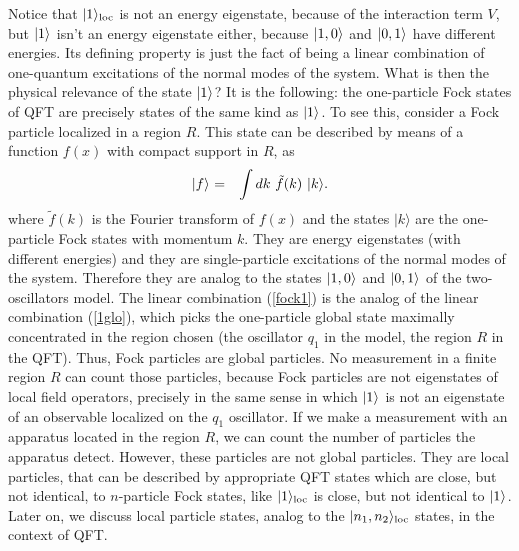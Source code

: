 \documentclass[10pt, nofootinbib]{revtex4}
\newcommand{\bea}{\begin{eqnarray}}
\newcommand{\eea}{\end{eqnarray}}
\begin{document}
Notice that $|1\rangle_{\rm loc}$ is not an energy eigenstate, because
of the interaction term $V$, but $|1\rangle_{\rm }$ isn't an energy
eigenstate either, because $ |1,0\rangle_{\rm }$ and $|0,1\rangle_{\rm
}$ have different energies.  Its defining property is just the fact of
being a linear combination of one-quantum excitations of the normal
modes of the system.  What is then the physical relevance of the state
$|1\rangle_{\rm }$?  It is the following: the one-particle Fock states
of QFT are precisely states of the same kind as $|1\rangle_{\rm }$. 
To see this, consider a Fock particle localized in a region $R$.  This
state can be described by means of a function $f(x)$ with compact
support in $R$, as
%
\bea
|f\rangle_{\rm } &=& \int dk \ \tilde f(k)\ |k\rangle. 
\label{fock1}
\eea
%
where $\tilde f(k)$ is the Fourier transform of $f(x)$ and the states
$|k\rangle$ are the one-particle Fock states with momentum $k$.  They
are energy eigenstates (with different energies) and they are
single-particle excitations of the normal modes of the system. 
Therefore they are analog to the states $|1,0\rangle_{\rm }$ and
$|0,1\rangle_{\rm }$ of the two-oscillators model.  The linear
combination (\ref{fock1}) is the analog of the linear combination
(\ref{1glo}), which picks the one-particle global state maximally
concentrated in the region chosen (the oscillator $q_{1}$ in the
model, the region $R$ in the QFT).  Thus, Fock particles are global
particles.  No measurement in a finite region $R$ can count those
particles, because Fock particles are not eigenstates of local field
operators, precisely in the same sense in which $|1\rangle_{\rm }$ is
not an eigenstate of an observable localized on the $q_{1}$
oscillator.  If we make a measurement with an apparatus located in the
region $R$, we can count the number of particles the apparatus detect. 
However, these particles are not global particles.  They are local
particles, that can be described by appropriate QFT states which are
close, but not identical, to $n$-particle Fock states, like
$|1\rangle_{\rm loc}$ is close, but not identical to $|1\rangle_{\rm
}$.  Later on, we discuss local particle states, analog to the
$|n_{1},n_{2}\rangle_{\rm loc}$ states, in the context of QFT.
\end{document}

